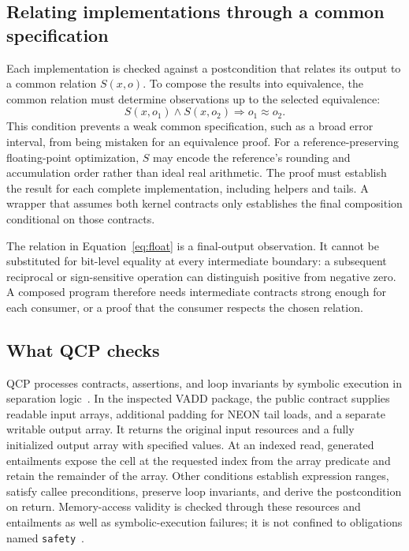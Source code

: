 \subsection{Relating implementations through a common specification}
Each implementation is checked against a postcondition that relates its output to a common relation $S(x,o)$. To compose the results into equivalence, the common relation must determine observations up to the selected equivalence:
\begin{equation}
 S(x,o_1)\land S(x,o_2)\Longrightarrow o_1\approx o_2.
 \label{eq:unique}
\end{equation}
This condition prevents a weak common specification, such as a broad error interval, from being mistaken for an equivalence proof. For a reference-preserving floating-point optimization, $S$ may encode the reference's rounding and accumulation order rather than ideal real arithmetic. The proof must establish the result for each complete implementation, including helpers and tails. A wrapper that assumes both kernel contracts only establishes the final composition conditional on those contracts.

The relation in Equation~\ref{eq:float} is a final-output observation. It cannot be substituted for bit-level equality at every intermediate boundary: a subsequent reciprocal or sign-sensitive operation can distinguish positive from negative zero. A composed program therefore needs intermediate contracts strong enough for each consumer, or a proof that the consumer respects the chosen relation.

\subsection{What QCP checks}
QCP processes contracts, assertions, and loop invariants by symbolic execution in separation logic~\cite{qcp,qcp-tutorials}. In the inspected VADD package, the public contract supplies readable input arrays, additional padding for NEON tail loads, and a separate writable output array. It returns the original input resources and a fully initialized output array with specified values. At an indexed read, generated entailments expose the cell at the requested index from the array predicate and retain the remainder of the array. Other conditions establish expression ranges, satisfy callee preconditions, preserve loop invariants, and derive the postcondition on return. Memory-access validity is checked through these resources and entailments as well as symbolic-execution failures; it is not confined to obligations named \texttt{safety}~\cite{qcp-safety}.

